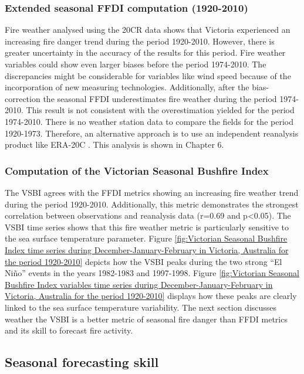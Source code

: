 \subsubsection{Extended seasonal FFDI computation (1920-2010)}

Fire weather analysed using the 20CR data shows that Victoria experienced
an increasing fire danger trend during the period 1920-2010. However,
there is greater uncertainty in the accuracy of the results for this
period. Fire weather variables could show even larger biases before
the period 1974-2010. The discrepancies might be considerable for
variables like wind speed because of the incorporation of new measuring
technologies. Additionally, after the bias-correction the seasonal
FFDI underestimates fire weather during the period 1974-2010. This
result is not consistent with the overestimation yielded for the period
1974-2010. There is no weather station data to compare the fields
for the period 1920-1973. Therefore, an alternative approach is to
use an independent reanalysis product like ERA-20C \citep{Stickler2014}.
This analysis is shown in Chapter 6.


\subsubsection{Computation of the Victorian Seasonal Bushfire Index}

The VSBI agrees with the FFDI metrics showing an increasing fire weather
trend during the period 1920-2010. Additionally, this metric demonstrates
the strongest correlation between observations and reanalysis data
(r=0.69 and p<0.05). The VSBI time series shows that this fire weather
metric is particularly sensitive to the sea surface temperature parameter.
Figure \ref{fig:Victorian Seasonal Bushfire Index time series during December-January-February in Victoria, Australia for the period 1920-2010}
depicts how the VSBI peaks during the two strong ``El Ni\~no'' events
in the years 1982-1983 and 1997-1998. Figure \ref{fig:Victorian Seasonal Bushfire Index variables time series during December-January-February in Victoria, Australia for the period 1920-2010}
displays how these peaks are clearly linked to the sea surface temperature
variability. The next section discusses weather the VSBI is a better
metric of seasonal fire danger than FFDI metrics and its skill to
forecast fire activity. 


\subsection{Seasonal forecasting skill}

